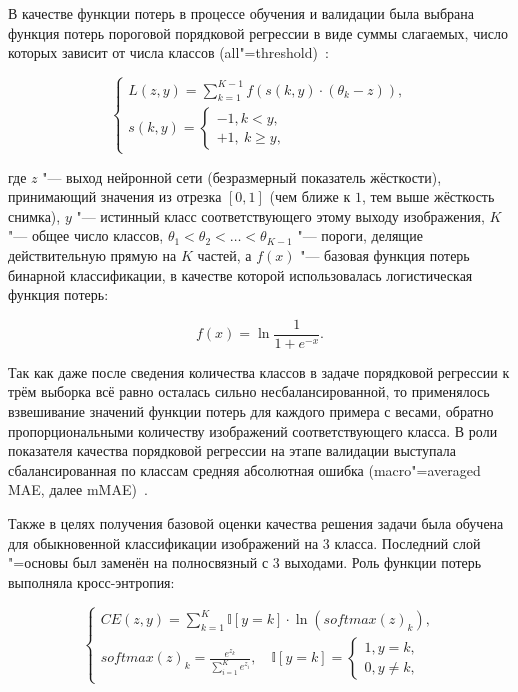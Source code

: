 В качестве функции потерь в процессе обучения и валидации была выбрана функция потерь пороговой порядковой регрессии в виде суммы слагаемых, число которых зависит от числа классов (all"=threshold)~\cite{rennie2005loss}:

\begin{equation}
	\begin{cases}
		L \left( z, y \right) = \sum_{k=1}^{K-1} f \left( s \left( k, y \right) \cdot \left( \theta_k-z \right) \right), \\
		s \left( k, y \right) =
		\begin{cases}
			-1, k < y, \\
			+1, \ k \geq y,
		\end{cases}
	\end{cases} \nonumber
\end{equation}

\noindent где $z$ "--- выход нейронной сети (безразмерный показатель жёсткости), принимающий значения из отрезка $\left[ 0, 1 \right]$ (чем ближе к $1$, тем выше жёсткость снимка), $y$ "--- истинный класс соответствующего этому выходу изображения, $K$ "--- общее число классов, $\theta_1 < \theta_2 < \ldots < \theta_{K-1}$ "--- пороги, делящие действительную прямую на $K$ частей, а $f(x)$ "--- базовая функция потерь бинарной классификации, в качестве которой использовалась логистическая функция потерь:

\begin{equation}
	f \left( x \right) = \ln{\frac{1}{1+e^{-x}}}. \nonumber
\end{equation}

Так как даже после сведения количества классов в задаче порядковой регрессии к трём выборка всё равно осталась сильно несбалансированной, то применялось взвешивание значений функции потерь для каждого примера с весами, обратно пропорциональными количеству изображений соответствующего класса. В роли показателя качества порядковой регрессии на этапе валидации выступала сбалансированная по классам средняя абсолютная ошибка (macro"=averaged MAE, далее mMAE)~\cite{baccianella2009evaluation}.

Также в целях получения базовой оценки качества решения задачи была обучена  для обыкновенной классификации изображений на 3 класса. Последний слой "=основы был заменён на полносвязный с 3 выходами. Роль функции потерь выполняла кросс-энтропия:

\begin{equation}
	\begin{cases}
		CE \left( z,y \right) = \sum_{k=1}^{K}{\mathbb{I} \left[ y = k \right] \cdot \ln{\left( softmax \left( z \right)_k \right)}}, \\
		softmax \left( z \right)_k = \frac{e^{z_k}}{\sum_{i=1}^{K}e^{z_i}},\quad \mathbb{I} \left[ y = k \right] =
		\begin{cases}
			1, y = k, \\
			0, y \neq k,
		\end{cases}
	\end{cases} \nonumber
\end{equation}

